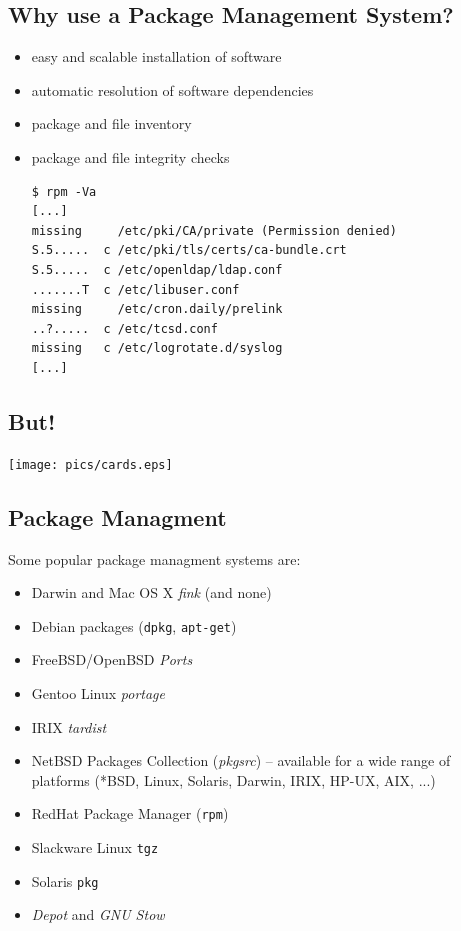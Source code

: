 \documentclass[xga]{xdvislides}
\begin{document}
\subsection{Why use a Package Management System?}
\begin{itemize}
	\item easy and scalable installation of software
	\item automatic resolution of software dependencies
	\item package and file inventory
	\item package and file integrity checks \\
\begin{verbatim}
$ rpm -Va
[...]
missing     /etc/pki/CA/private (Permission denied)
S.5.....  c /etc/pki/tls/certs/ca-bundle.crt
S.5.....  c /etc/openldap/ldap.conf
.......T  c /etc/libuser.conf
missing     /etc/cron.daily/prelink
..?.....  c /etc/tcsd.conf
missing   c /etc/logrotate.d/syslog
[...]
\end{verbatim}
\end{itemize}

\subsection{But!}
\vspace*{\fill}
\begin{center}
	\texttt{[image: pics/cards.eps]}
\end{center}
\vspace*{\fill}
\subsection{Package Managment}
Some popular package managment systems are:
\begin{itemize}
	\item Darwin and Mac OS X {\em fink} (and none)
	\item Debian packages (\verb+dpkg+, \verb+apt-get+)
	\item FreeBSD/OpenBSD {\em Ports}
	\item Gentoo Linux {\em portage}
	\item IRIX {\em tardist}
	\item NetBSD Packages Collection ({\em pkgsrc}) -- available for a
		wide range of platforms (*BSD, Linux, Solaris, Darwin, IRIX,
		HP-UX, AIX, ...)
	\item RedHat Package Manager (\verb+rpm+)
	\item Slackware Linux \verb+tgz+
	\item Solaris \verb+pkg+
	\item {\em Depot} and {\em GNU Stow}
\end{itemize}
\end{document}
